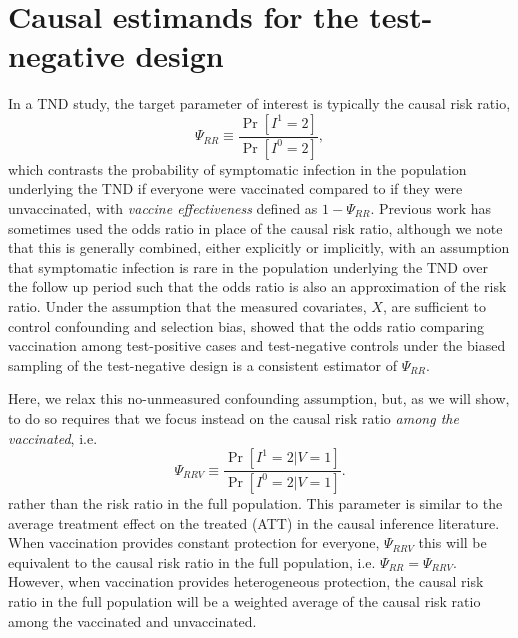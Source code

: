 \documentclass[11pt]{article}
\begin{document}
\section{Causal estimands for the test-negative design} \label{sec:estimands}
In a TND study, the target parameter of interest is typically the causal risk ratio,
\begin{equation*}
    \Psi_{RR} \equiv \dfrac{\Pr[I^1 = 2]}{\Pr[I^0 = 2]},
\end{equation*}
which contrasts the probability of symptomatic infection in the population underlying the TND if everyone were vaccinated compared to if they were unvaccinated, with \textit{vaccine effectiveness} defined as $1 - \Psi_{RR}$. Previous work has sometimes used the odds ratio in place of the causal risk ratio, although we note that this is generally combined, either explicitly or implicitly, with an assumption that symptomatic infection is rare in the population underlying the TND over the follow up period such that the odds ratio is also an approximation of the risk ratio. Under the assumption that the measured covariates, $X$, are sufficient to control confounding and selection bias,  \cite{schnitzer_estimands_2022} showed that the odds ratio comparing vaccination among test-positive cases and test-negative controls under the biased sampling of the test-negative design is a consistent estimator of $\Psi_{RR}$. 

Here, we relax this no-unmeasured confounding assumption, but, as we will show, to do so requires that we focus instead on the causal risk ratio \textit{among the vaccinated}, i.e.
\begin{equation*}
    \Psi_{RRV} \equiv \dfrac{\Pr[I^1 = 2 | V = 1]}{\Pr[I^0 = 2 | V = 1]} .
\end{equation*}
rather than the risk ratio in the full population. This parameter is similar to the average treatment effect on the treated (ATT) in the causal inference literature. When vaccination provides constant protection for everyone, $\Psi_{RRV}$ this will be equivalent to the causal risk ratio in the full population, i.e. $\Psi_{RR} = \Psi_{RRV}$. However, when vaccination provides heterogeneous protection, the causal risk ratio in the full population will be a weighted average of the causal risk ratio among the vaccinated and unvaccinated.

\end{document}
